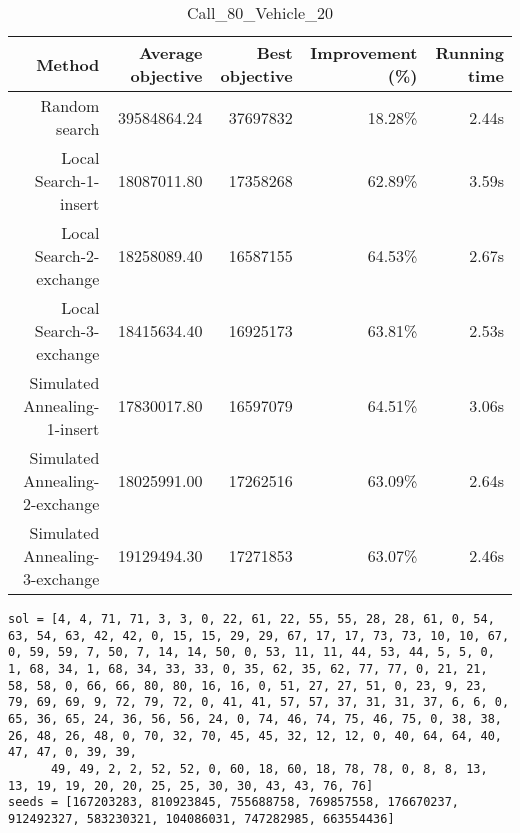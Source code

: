 \begin{table}[ht]
\centering
\caption{Call\_80\_Vehicle\_20}
\label{tab:call80vehicle20}
\begin{tabular}{|r|r|r|r|r|}
Method & Average objective & Best objective & Improvement (\%) & Running time \\
\hline
Random search & 39584864.24 & 37697832 & 18.28\% & 2.44s\\
Local Search-1-insert & 18087011.80 & 17358268 & 62.89\% & 3.59s\\
Local Search-2-exchange & 18258089.40 & 16587155 & 64.53\% & 2.67s\\
Local Search-3-exchange & 18415634.40 & 16925173 & 63.81\% & 2.53s\\
Simulated Annealing-1-insert & 17830017.80 & 16597079 & 64.51\% & 3.06s\\
Simulated Annealing-2-exchange & 18025991.00 & 17262516 & 63.09\% & 2.64s\\
Simulated Annealing-3-exchange & 19129494.30 & 17271853 & 63.07\% & 2.46s\\
\end{tabular}%
\end{table}
\begin{lstlisting}[label={lst:call80vehicle20},caption=Optimal solution call\_80\_vehicle\_20]
sol = [4, 4, 71, 71, 3, 3, 0, 22, 61, 22, 55, 55, 28, 28, 61, 0, 54, 63, 54, 63, 42, 42, 0, 15, 15, 29, 29, 67, 17, 17, 73, 73, 10, 10, 67, 0, 59, 59, 7, 50, 7, 14, 14, 50, 0, 53, 11, 11, 44, 53, 44, 5, 5, 0, 1, 68, 34, 1, 68, 34, 33, 33, 0, 35, 62, 35, 62, 77, 77, 0, 21, 21, 58, 58, 0, 66, 66, 80, 80, 16, 16, 0, 51, 27, 27, 51, 0, 23, 9, 23, 79, 69, 69, 9, 72, 79, 72, 0, 41, 41, 57, 57, 37, 31, 31, 37, 6, 6, 0, 65, 36, 65, 24, 36, 56, 56, 24, 0, 74, 46, 74, 75, 46, 75, 0, 38, 38, 26, 48, 26, 48, 0, 70, 32, 70, 45, 45, 32, 12, 12, 0, 40, 64, 64, 40, 47, 47, 0, 39, 39,
      49, 49, 2, 2, 52, 52, 0, 60, 18, 60, 18, 78, 78, 0, 8, 8, 13, 13, 19, 19, 20, 20, 25, 25, 30, 30, 43, 43, 76, 76]
seeds = [167203283, 810923845, 755688758, 769857558, 176670237, 912492327, 583230321, 104086031, 747282985, 663554436]
\end{lstlisting}%
\clearpage


